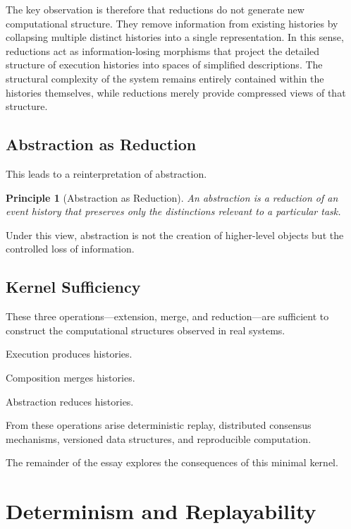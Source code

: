 \documentclass[12pt]{article}
\newtheorem{principle}{Principle}
\begin{document}
The key observation is therefore that reductions do not
generate new computational structure. They remove information
from existing histories by collapsing multiple distinct
histories into a single representation. In this sense,
reductions act as information-losing morphisms that project
the detailed structure of execution histories into spaces
of simplified descriptions. The structural complexity of the
system remains entirely contained within the histories
themselves, while reductions merely provide compressed views
of that structure.

\subsection{Abstraction as Reduction}

This leads to a reinterpretation of abstraction.

\begin{principle}[Abstraction as Reduction]
An abstraction is a reduction of an event history that preserves
only the distinctions relevant to a particular task.
\end{principle}

Under this view, abstraction is not the creation of higher-level
objects but the controlled loss of information.

\subsection{Kernel Sufficiency}

These three operations—extension, merge, and reduction—are
sufficient to construct the computational structures
observed in real systems.

Execution produces histories.

Composition merges histories.

Abstraction reduces histories.

From these operations arise deterministic replay,
distributed consensus mechanisms,
versioned data structures,
and reproducible computation.

The remainder of the essay explores the consequences
of this minimal kernel.


\section{Determinism and Replayability}
\end{document}
